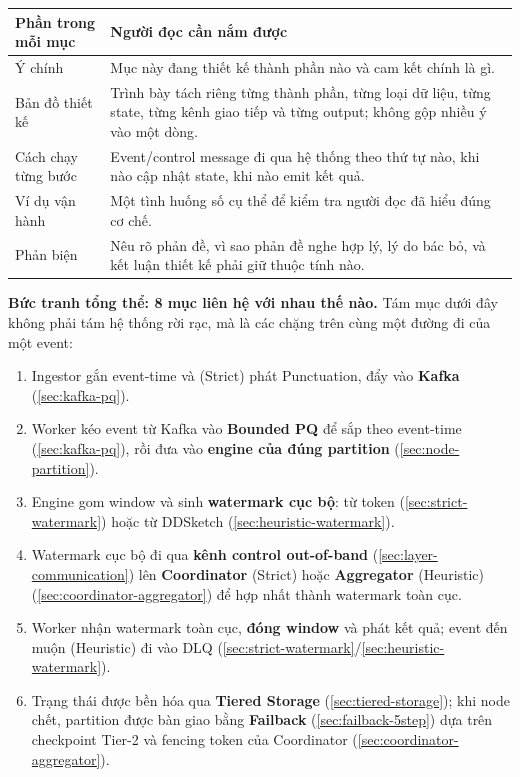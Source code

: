 \documentclass[12pt,a4paper]{article}
\begin{document}
\begin{table}[H]
\centering
\begin{tabular}{p{4.5cm}p{10.5cm}}
\toprule
\textbf{Phần trong mỗi mục} & \textbf{Người đọc cần nắm được} \\
\midrule
Ý chính & Mục này đang thiết kế thành phần nào và cam kết chính là gì. \\
Bản đồ thiết kế & Trình bày tách riêng từng thành phần, từng loại dữ liệu, từng state, từng kênh giao tiếp và từng output; không gộp nhiều ý vào một dòng. \\
Cách chạy từng bước & Event/control message đi qua hệ thống theo thứ tự nào, khi nào cập nhật state, khi nào emit kết quả. \\
Ví dụ vận hành & Một tình huống số cụ thể để kiểm tra người đọc đã hiểu đúng cơ chế. \\
Phản biện & Nêu rõ phản đề, vì sao phản đề nghe hợp lý, lý do bác bỏ, và kết luận thiết kế phải giữ thuộc tính nào. \\
\bottomrule
\end{tabular}
\end{table}
\textbf{Bức tranh tổng thể: 8 mục liên hệ với nhau thế nào.} Tám mục dưới đây không phải tám hệ thống rời rạc, mà là các chặng trên cùng một đường đi của một event:

\begin{enumerate}
\item Ingestor gắn event-time và (Strict) phát Punctuation, đẩy vào \textbf{Kafka} (\ref{sec:kafka-pq}).
\item Worker kéo event từ Kafka vào \textbf{Bounded PQ} để sắp theo event-time (\ref{sec:kafka-pq}), rồi đưa vào \textbf{engine của đúng partition} (\ref{sec:node-partition}).
\item Engine gom window và sinh \textbf{watermark cục bộ}:  từ token (\ref{sec:strict-watermark}) hoặc  từ DDSketch (\ref{sec:heuristic-watermark}).
\item Watermark cục bộ đi qua \textbf{kênh control out-of-band} (\ref{sec:layer-communication}) lên \textbf{Coordinator} (Strict) hoặc \textbf{Aggregator} (Heuristic) (\ref{sec:coordinator-aggregator}) để hợp nhất thành watermark toàn cục.
\item Worker nhận watermark toàn cục, \textbf{đóng window} và phát kết quả; event đến muộn (Heuristic) đi vào DLQ (\ref{sec:strict-watermark}/\ref{sec:heuristic-watermark}).
\item Trạng thái được bền hóa qua \textbf{Tiered Storage} (\ref{sec:tiered-storage}); khi node chết, partition được bàn giao bằng \textbf{Failback} (\ref{sec:failback-5step}) dựa trên checkpoint Tier-2 và fencing token của Coordinator (\ref{sec:coordinator-aggregator}).
\end{enumerate}
\end{document}
